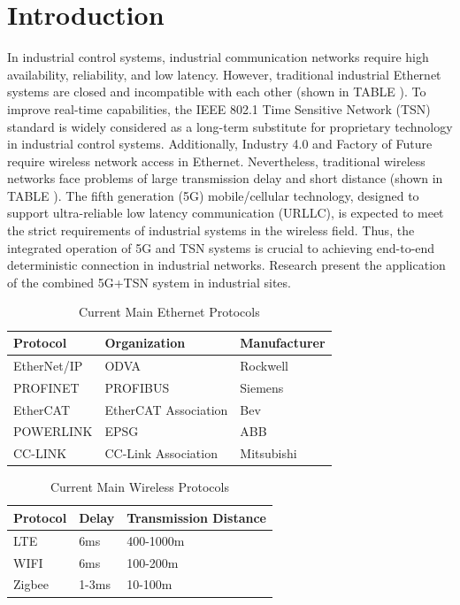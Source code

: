 \documentclass[english]{cccconf}
\begin{document}


\section{Introduction}
In industrial control systems, industrial communication networks require high availability, reliability, and low latency. However, traditional industrial Ethernet systems are closed and incompatible with each other (shown in TABLE \uppercase\expandafter{}). To improve real-time capabilities, the IEEE 802.1 Time Sensitive Network (TSN) standard is widely considered as a long-term substitute for proprietary technology in industrial control systems. Additionally, Industry 4.0 and Factory of Future require wireless network access in Ethernet. Nevertheless, traditional wireless networks face problems of large transmission delay and short distance\cite{2013Recommendations} (shown in TABLE \uppercase\expandafter{}). The fifth generation (5G) mobile/cellular technology, designed to support ultra-reliable low latency communication (URLLC), is expected to meet the strict requirements of industrial systems in the wireless field. Thus, the integrated operation of 5G and TSN systems is crucial to achieving end-to-end deterministic connection in industrial networks. Research\cite{zhang2022wireless} present the application of the combined 5G+TSN system in industrial sites. 
\begin{table}[!htb]
	\centering
	\caption{Current Main Ethernet Protocols}
	\label{tab1}
	\begin{tabular}{l|l|l}
			\hline
\textbf{Protocol}& \textbf{Organization}& \textbf{Manufacturer} \\
\hline
EtherNet/IP
& ODVA
& Rockwell \\
\hline
PROFINET
& PROFIBUS
& Siemens \\
\hline
EtherCAT
& EtherCAT Association
& Bev \\
\hline
POWERLINK
& EPSG
& ABB \\
\hline
CC-LINK
& CC-Link Association
& Mitsubishi \\
\hline
	\end{tabular}
\end{table}
\begin{table}[!htb]
	\centering
	\caption{Current Main Wireless Protocols}
	\label{tab1}
	\begin{tabular}{l|l|l}
\hline
\textbf{Protocol}& \textbf{Delay}& \textbf{Transmission Distance} \\
\hline
LTE
& 6ms
& 400-1000m \\
\hline
WIFI
& 6ms
& 100-200m \\
\hline
Zigbee
& 1-3ms
& 10-100m \\
\hline		
	\end{tabular}
\end{table}
\end{document}
